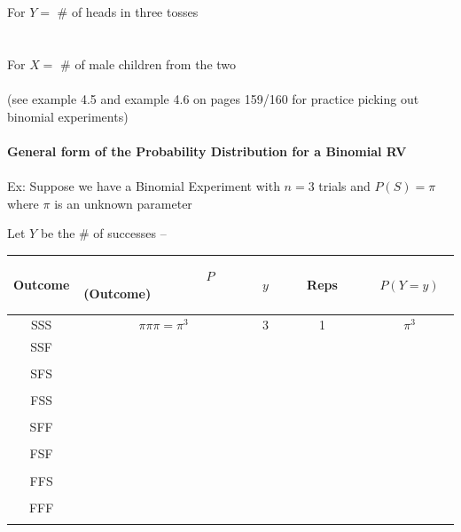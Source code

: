 For $Y=$ \# of heads in three tosses\\~\\~\\
For $X=$ \# of male children from the two\\~\\
(see example 4.5 and example 4.6 on pages 159/160 for practice picking out binomial experiments)\\~\\
\large\textbf{General form of the Probability Distribution for a Binomial RV}\normalsize\\~\\
Ex: Suppose we have a Binomial Experiment with $n=3$ trials and $P(S)=\pi$ where $\pi$ is an unknown parameter\\
\bi
\item Let $Y$ be the \# of successes -- \underbar{~~~~~~~~~~~~~~~~~~~~~~~~~~~~~~~~~~~~~~~~~~~~~~~~~~~~~~~~~~~~~~~}
\ei
\begin{tabular}{|c|c|c|c|c|}
  \hline
 Outcome & ~~~~~~~~~~~~~$P$(Outcome)~~~~~~~~~~~~~ &~~ $y$~~ & ~~~Reps~~~ &~~~~~~~~~~ $P(Y=y)$~~~~~~~~~~\\
 \hline
 SSS & $\pi\pi\pi=\pi^3$ & 3 & 1 & $\pi^3$\\
 \hline
 SSF & &&&\\
& &&&\\
 SFS &&&&\\
& &&&\\
 FSS &&&&\\
& &&&\\
 \hline
 SFF &&&&\\
& &&&\\
 FSF&&&&\\
& &&&\\
 FFS&&&&\\
& &&&\\
 \hline
 FFF&&&&\\
& &&&\\
 \hline
\end{tabular}

\newpage

